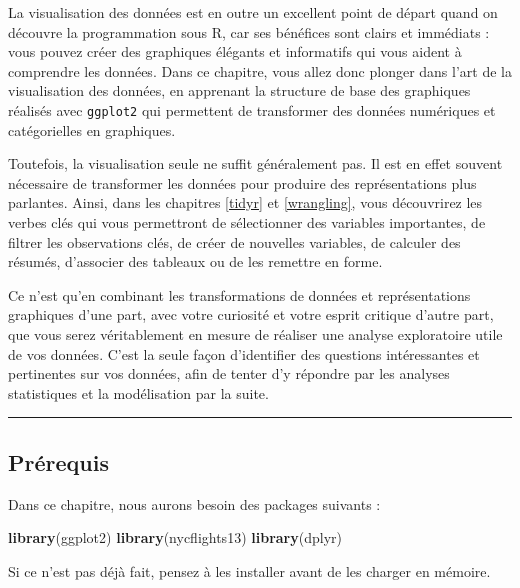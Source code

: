 \documentclass[a4paperpaper,]{article}
\newenvironment{Shaded}{\begin{snugshade}}{\end{snugshade}}
\newcommand{\KeywordTok}[1]{\textcolor[rgb]{0.13,0.29,0.53}{\textbf{#1}}}
\newcommand{\NormalTok}[1]{#1}
\theoremstyle{definition}
\theoremstyle{definition}
\theoremstyle{definition}
\theoremstyle{remark}
\begin{document}
La visualisation des données est en outre un excellent point de départ
quand on découvre la programmation sous R, car ses bénéfices sont clairs
et immédiats : vous pouvez créer des graphiques élégants et informatifs
qui vous aident à comprendre les données. Dans ce chapitre, vous allez
donc plonger dans l'art de la visualisation des données, en apprenant la
structure de base des graphiques réalisés avec \texttt{ggplot2} qui
permettent de transformer des données numériques et catégorielles en
graphiques.

Toutefois, la visualisation seule ne suffit généralement pas. Il est en
effet souvent nécessaire de transformer les données pour produire des
représentations plus parlantes. Ainsi, dans les chapitres \ref{tidyr} et
\ref{wrangling}, vous découvrirez les verbes clés qui vous permettront
de sélectionner des variables importantes, de filtrer les observations
clés, de créer de nouvelles variables, de calculer des résumés,
d'associer des tableaux ou de les remettre en forme.

Ce n'est qu'en combinant les transformations de données et
représentations graphiques d'une part, avec votre curiosité et votre
esprit critique d'autre part, que vous serez véritablement en mesure de
réaliser une analyse exploratoire utile de vos données. C'est la seule
façon d'identifier des questions intéressantes et pertinentes sur vos
données, afin de tenter d'y répondre par les analyses statistiques et la
modélisation par la suite.

\begin{center}\rule{0.5\linewidth}{\linethickness}\end{center}

\subsection{Prérequis}\label{prerequis}

Dans ce chapitre, nous aurons besoin des packages suivants :

\begin{Shaded}
\begin{Highlighting}[]
\KeywordTok{library}\NormalTok{(ggplot2)}
\KeywordTok{library}\NormalTok{(nycflights13)}
\KeywordTok{library}\NormalTok{(dplyr)}
\end{Highlighting}
\end{Shaded}

Si ce n'est pas déjà fait, pensez à les installer avant de les charger
en mémoire.
\end{document}

